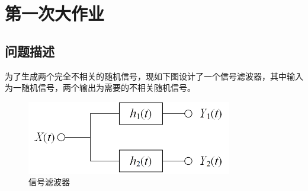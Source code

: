 \documentclass[11pt]{article}
\begin{document}
\newpage

\setcounter{tocdepth}{3}
\tableofcontents
\newpage

\setcounter{page}{1}
\section{第一次大作业}
\subsection{问题描述}
为了生成两个完全不相关的随机信号，现如下图设计了一个信号滤波器，其中输入为一随机信号，两个输出为需要的不相关随机信号。
\begin{figure}[H]
  \centering
  \includegraphics[width=0.8\textwidth]{信号发生器示意图.png}
  \caption{信号滤波器}
  \label{fig:信号滤波器}
\end{figure}
\end{document}
